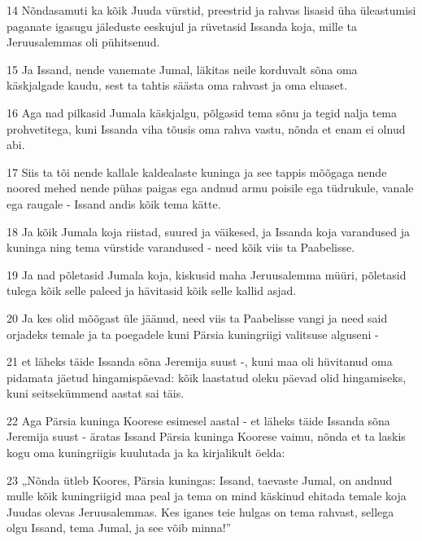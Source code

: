 \par 14 Nõndasamuti ka kõik Juuda vürstid, preestrid ja rahvas lisasid üha üleastumisi paganate igasugu jäleduste eeskujul ja rüvetasid Issanda koja, mille ta Jeruusalemmas oli pühitsenud.
\par 15 Ja Issand, nende vanemate Jumal, läkitas neile korduvalt sõna oma käskjalgade kaudu, sest ta tahtis säästa oma rahvast ja oma eluaset.
\par 16 Aga nad pilkasid Jumala käskjalgu, põlgasid tema sõnu ja tegid nalja tema prohvetitega, kuni Issanda viha tõusis oma rahva vastu, nõnda et enam ei olnud abi.
\par 17 Siis ta tõi nende kallale kaldealaste kuninga ja see tappis mõõgaga nende noored mehed nende pühas paigas ega andnud armu poisile ega tüdrukule, vanale ega raugale - Issand andis kõik tema kätte.
\par 18 Ja kõik Jumala koja riistad, suured ja väikesed, ja Issanda koja varandused ja kuninga ning tema vürstide varandused - need kõik viis ta Paabelisse.
\par 19 Ja nad põletasid Jumala koja, kiskusid maha Jeruusalemma müüri, põletasid tulega kõik selle paleed ja hävitasid kõik selle kallid asjad.
\par 20 Ja kes olid mõõgast üle jäänud, need viis ta Paabelisse vangi ja need said orjadeks temale ja ta poegadele kuni Pärsia kuningriigi valitsuse alguseni -
\par 21 et läheks täide Issanda sõna Jeremija suust -, kuni maa oli hüvitanud oma pidamata jäetud hingamispäevad: kõik laastatud oleku päevad olid hingamiseks, kuni seitsekümmend aastat sai täis.
\par 22 Aga Pärsia kuninga Koorese esimesel aastal - et läheks täide Issanda sõna Jeremija suust - äratas Issand Pärsia kuninga Koorese vaimu, nõnda et ta laskis kogu oma kuningriigis kuulutada ja ka kirjalikult öelda:
\par 23 „Nõnda ütleb Koores, Pärsia kuningas: Issand, taevaste Jumal, on andnud mulle kõik kuningriigid maa peal ja tema on mind käskinud ehitada temale koja Juudas olevas Jeruusalemmas. Kes iganes teie hulgas on tema rahvast, sellega olgu Issand, tema Jumal, ja see võib minna!”



